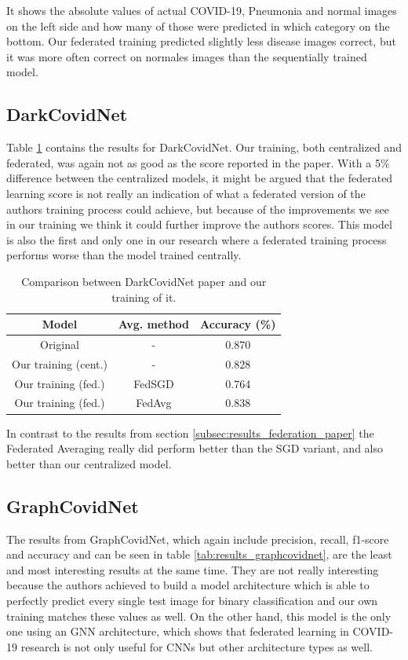 It shows the absolute values of actual COVID-19, Pneumonia and normal images on the left side and how many of those were predicted in which category on the bottom. Our federated training predicted slightly less disease images correct, but it was more often correct on normales images than the sequentially trained model.

\subsection{DarkCovidNet}
Table \ref{tab:results_darkcovidnet} contains the results for DarkCovidNet. Our training, both centralized and federated, was again not as good as the score reported in the paper. With a 5\% difference between the centralized models, it might be argued that the federated learning score is not really an indication of what a federated version of the authors training process could achieve, but because of the improvements we see in our training we think it could further improve the authors scores. This model is also the first and only one in our research where a federated training process performs worse than the model trained centrally.

\begin{table}[htbp]
    \small
    \centering
    \caption{Comparison between DarkCovidNet paper\cite{dark_net} and our training of it.}
    \begin{tabular}{c|c|c}
        Model & Avg. method & Accuracy (\%)\\
        \hline
        Original & - & 0.870 \\
        Our training (cent.) & - & 0.828\\
        Our training (fed.) & FedSGD & 0.764 \\
        Our training (fed.) & FedAvg & 0.838 \\
    \end{tabular}
    \label{tab:results_darkcovidnet}
\end{table}

In contrast to the results from section \ref{subsec:results_federation_paper} the Federated Averaging really did perform better than the SGD variant, and also better than our centralized model.

\subsection{GraphCovidNet}
The results from GraphCovidNet, which again include precision, recall, f1-score and accuracy and can be seen in table \ref{tab:results_graphcovidnet}, are the least and most interesting results at the same time. They are not really interesting because the authors achieved to build a model architecture which is able to perfectly predict every single test image for binary classification and our own training matches these values as well. On the other hand, this model is the only one using an GNN architecture, which shows that federated learning in COVID-19 research is not only useful for CNNs but other architecture types as well.


